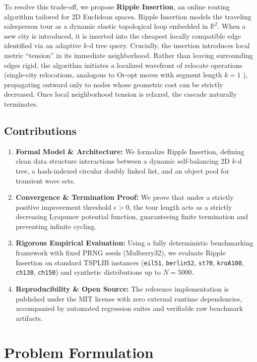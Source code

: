 \documentclass[11pt,a4paper]{article}
\theoremstyle{definition}
\begin{document}
To resolve this trade-off, we propose \textbf{Ripple Insertion}, an online routing algorithm tailored for 2D Euclidean spaces. Ripple Insertion models the traveling salesperson tour as a dynamic elastic topological loop embedded in $\mathbb{R}^2$. When a new city is introduced, it is inserted into the cheapest locally compatible edge identified via an adaptive $k$-d tree query. Crucially, the insertion introduces local metric ``tension'' in its immediate neighborhood. Rather than leaving surrounding edges rigid, the algorithm initiates a localized wavefront of relocate operations (single-city relocations, analogous to Or-opt moves with segment length $k=1$ \cite{or1976traveling}), propagating outward only to nodes whose geometric cost can be strictly decreased. Once local neighborhood tension is relaxed, the cascade naturally terminates.

\subsection{Contributions}
\begin{enumerate}
    \item \textbf{Formal Model \& Architecture:} We formalize Ripple Insertion, defining clean data structure interactions between a dynamic self-balancing 2D $k$-d tree, a hash-indexed circular doubly linked list, and an object pool for transient wave sets.
    \item \textbf{Convergence \& Termination Proof:} We prove that under a strictly positive improvement threshold $\epsilon > 0$, the tour length acts as a strictly decreasing Lyapunov potential function, guaranteeing finite termination and preventing infinite cycling.
    \item \textbf{Rigorous Empirical Evaluation:} Using a fully deterministic benchmarking framework with fixed PRNG seeds (Mulberry32), we evaluate Ripple Insertion on standard TSPLIB instances (\texttt{eil51}, \texttt{berlin52}, \texttt{st70}, \texttt{kroA100}, \texttt{ch130}, \texttt{ch150}) and synthetic distributions up to $N = 5000$.
    \item \textbf{Reproducibility \& Open Source:} The reference implementation is published under the MIT license with zero external runtime dependencies, accompanied by automated regression suites and verifiable raw benchmark artifacts.
\end{enumerate}

\section{Problem Formulation}
\end{document}
